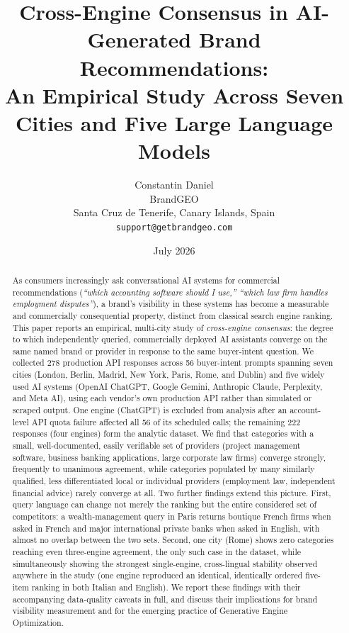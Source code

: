 \documentclass[11pt]{article}
\title{\textbf{Cross-Engine Consensus in AI-Generated Brand Recommendations:\\
An Empirical Study Across Seven Cities and Five Large Language Models}}
\author{
Constantin Daniel\\
BrandGEO\\
Santa Cruz de Tenerife, Canary Islands, Spain\\
\texttt{support@getbrandgeo.com}
}
\date{July 2026}
\begin{document}
\maketitle

\begin{abstract}
As consumers increasingly ask conversational AI systems for commercial recommendations
(\textit{``which accounting software should I use,''} \textit{``which law firm handles
employment disputes''}), a brand's visibility in these systems has become a measurable
and commercially consequential property, distinct from classical search engine ranking.
This paper reports an empirical, multi-city study of \emph{cross-engine consensus}: the
degree to which independently queried, commercially deployed AI assistants converge on
the same named brand or provider in response to the same buyer-intent question. We
collected 278 production API responses across 56 buyer-intent prompts spanning seven
cities (London, Berlin, Madrid, New York, Paris, Rome, and Dublin) and five widely used
AI systems (OpenAI ChatGPT, Google Gemini, Anthropic Claude, Perplexity, and Meta AI),
using each vendor's own production API rather than simulated or scraped output. One
engine (ChatGPT) is excluded from analysis after an account-level API quota failure
affected all 56 of its scheduled calls; the remaining 222 responses (four engines) form
the analytic dataset. We find that categories with a small, well-documented, easily
verifiable set of providers (project management software, business banking applications,
large corporate law firms) converge strongly, frequently to unanimous agreement, while
categories populated by many similarly qualified, less differentiated local or
individual providers (employment law, independent financial advice) rarely converge at
all. Two further findings extend this picture. First, query language can change not
merely the ranking but the entire considered set of competitors: a wealth-management
query in Paris returns boutique French firms when asked in French and major
international private banks when asked in English, with almost no overlap between the
two sets. Second, one city (Rome) shows zero categories reaching even three-engine
agreement, the only such case in the dataset, while simultaneously showing the strongest
single-engine, cross-lingual stability observed anywhere in the study (one engine
reproduced an identical, identically ordered five-item ranking in both Italian and
English). We report these findings with their accompanying data-quality caveats in
full, and discuss their implications for brand visibility measurement and for the
emerging practice of Generative Engine Optimization.
\end{abstract}
\end{document}
